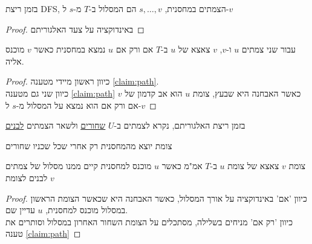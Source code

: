 \begin{claim}
\label{claim:path}
בזמן ריצת DFS, הצמתים במחסנית, 
$s,\ldots,v$
הם המסלול ב-$T$ מ-$s$ ל-$v$
\end{claim}
\begin{proof}
באינדוקציה על צעד האלגוריתם
\end{proof}
\begin{corollary}
עבור שני צמתים $u$ ו-$v$, $v$ צאצא של $u$ ב-$T$ אם ורק אם $u$ נמצא במחסנית כאשר $v$ מוכנס 
אליה.
\end{corollary}
\begin{proof}
כיוון ראשון מיידי מטענה
\ref{claim:path}.
\\
כיוון שני גם מטענה 
\ref{claim:path}
כאשר האבחנה היא שבעץ, צומת $u$ הוא אב קדמון של $v$ אם ורק אם הוא נמצא על המסלול מ-$s$
ל-$v$
\end{proof}

\begin{definition}
בזמן ריצת האלגוריתם, נקרא לצמתים ב-$U$ 
\underline{שחורים}
ולשאר הצמתים 
\underline{לבנים}
\end{definition}

\begin{claim}
צומת יוצא מהמחסנית רק אחרי שכל שכניו שחורים
\end{claim}

\begin{lemma}
צומת $v$ צאצא של צומת $u$ ב-$T$ אמ"מ כאשר $u$ 
מוכנס למחסנית קיים ממנו מסלול של צמתים לבנים לצומת $v$
\end{lemma}
\begin{proof}
כיוון 'אם' באינדוקציה על אורך המסלול, 
כאשר האבחנה היא שכאשר הצומת הראשון במסלול מוכנס למחסנית, $u$ עדיין שם.
\\
כיוון 'רק אם' מניחים בשלילה, מסתכלים על הצומת השחור האחרון במסלול וסותרים את טענה
\ref{claim:path}
\end{proof}
